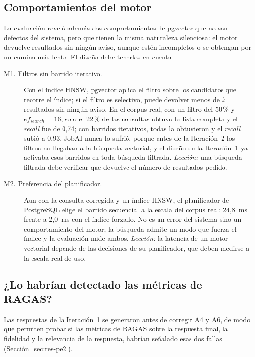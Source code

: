 \subsection{Comportamientos del motor}
\label{sec:res-motor}

La evaluación reveló además dos comportamientos de pgvector que no son defectos del sistema, pero que tienen la misma naturaleza silenciosa: el motor devuelve resultados sin ningún aviso, aunque estén incompletos o se obtengan por un camino más lento. El diseño debe tenerlos en cuenta.

\begin{description}
    \item[M1. Filtros sin barrido iterativo.] Con el índice HNSW, pgvector aplica el filtro sobre los candidatos que recorre el índice; si el filtro es selectivo, puede devolver menos de $k$ resultados sin ningún aviso. En el corpus real, con un filtro del 50\,\% y $ef_{search}=16$, solo el 22\,\% de las consultas obtuvo la lista completa y el \textit{recall} fue de 0,74; con barridos iterativos, todas la obtuvieron y el \textit{recall} subió a 0,93. JobAI nunca lo sufrió, porque antes de la Iteración~2 los filtros no llegaban a la búsqueda vectorial, y el diseño de la Iteración~1 ya activaba esos barridos en toda búsqueda filtrada. \emph{Lección:} una búsqueda filtrada debe verificar que devuelve el número de resultados pedido.
    \item[M2. Preferencia del planificador.] Aun con la consulta corregida y un índice HNSW, el planificador de PostgreSQL elige el barrido secuencial a la escala del corpus real: 24,8~ms frente a 2,0~ms con el índice forzado. No es un error del sistema sino un comportamiento del motor; la búsqueda admite un modo que fuerza el índice y la evaluación mide ambos. \emph{Lección:} la latencia de un motor vectorial depende de las decisiones de su planificador, que deben medirse a la escala real de uso.
\end{description}

\subsection{¿Lo habrían detectado las métricas de RAGAS?}
\label{sec:res-contrafactual}

Las respuestas de la Iteración~1 se generaron antes de corregir A4 y A6, de modo que permiten probar si las métricas de RAGAS sobre la respuesta final, la fidelidad y la relevancia de la respuesta, habrían señalado esas dos fallas (Sección~\ref{sec:res-pe2}).

